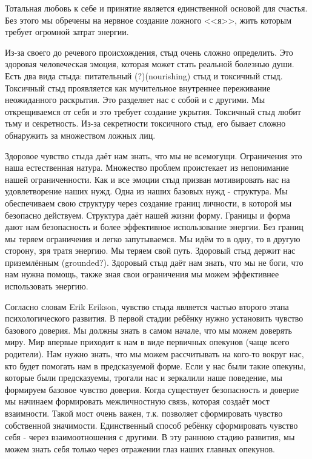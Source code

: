 \documentclass[10pt, fleqn]{article}
\begin{document}
Тотальная любовь к себе и принятие является единственной основой для счастья. Без этого мы обречены на нервное создание ложного <<я>>, жить которым требует огромной затрат энергии.


Из-за своего до речевого происхождения, стыд очень сложно определить. Это здоровая человеческая эмоция, которая может стать реальной болезнью души.
Есть два вида стыда: питательный (?)(nourishing) стыд и токсичный стыд. Токсичный стыд проявляется как мучительное внутреннее переживание неожиданного раскрытия. Это разделяет нас с собой и с другими. Мы открещиваемся от себя и это требует создание укрытия. Токсичный стыд любит тьму и секретность.
Из-за секретности токсичного стыд, его бывает сложно обнаружить за множеством ложных лиц.



Здоровое чувство стыда даёт нам знать, что мы не всемогущи. Ограничения это наша естественная натура. Множество проблем проистекает из непонимание нашей ограниченности.
Как и все эмоции стыд призван мотивировать нас на удовлетворение наших нужд.
Одна из наших базовых нужд - структура. Мы обеспечиваем свою структуру через создание границ личности, в которой мы безопасно действуем. Структура даёт нашей жизни форму. Границы и форма дают нам безопасность и более эффективное использование энергии.
Без границ мы теряем ограничения и легко запутываемся. Мы идём то в одну, то в другую сторону, зря тратя энергию. Мы теряем свой путь.
Здоровый стыд держит нас приземлённым (grounded?).
Здоровый стыд даёт нам знать, что мы не боги, что нам нужна помощь, также зная свои ограничения мы можем эффективнее использовать энергию.


Согласно словам Erik Erikson, чувство стыда является частью второго этапа психологического развития. В первой стадии ребёнку нужно установить чувство базового доверия.
Мы должны знать в самом начале, что мы можем доверять миру. Мир впервые приходит к нам в виде первичных опекунов (чаще всего родители). Нам нужно знать, что мы можем рассчитывать на кого-то вокруг нас, кто будет помогать нам в предсказуемой форме. Если у нас были такие опекуны, которые были предсказуемы, трогали нас и зеркалили наше поведение, мы формируем базовое чувство доверия. Когда существует безопасность и доверие мы начинаем формировать межличностную связь, которая создаёт мост взаимности. Такой мост очень важен, т.к. позволяет сформировать чувство собственной значимости. Единственный способ ребёнку сформировать чувство себя - через взаимоотношения с другими.
В эту раннюю стадию развития, мы можем знать себя только через отражении глаз наших главных опекунов.
\end{document}
